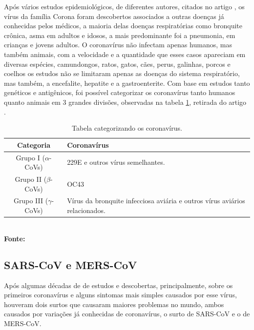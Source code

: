\documentclass[
  fleqn,ebook]{ic}
\begin{document}
Após vários estudos epidemiológicos, de diferentes autores, citados no artigo
\cite{jahangir2020coronavirus}, os vírus da família Corona foram descobertos
associados a outras doenças já conhecidas pelos médicos, a maioria delas doenças
respiratórias como bronquite crônica, asma em adultos e idosos, a mais
predominante foi a pneumonia, em crianças e jovens adultos. O coronavírus não
infectam apenas humanos, mas também animais, com a velocidade e a quantidade que
esses casos apareciam em diversas espécies, camundongos, ratos, gatos, cães,
perus, galinhas, porcos e coelhos os estudos não se limitaram apenas as doenças
do sistema respiratório, mas também, a encefalite, hepatite e a gastroenterite.
Com base em estudos tanto genéticos e antigênicos, foi possível categorizar os
coronavírus tanto humanos quanto animais em 3 grandes divisões, observadas na
tabela \ref{tab:corona3div}, retirada do artigo \cite{jahangir2020coronavirus}.

\begin{table}[H]
    \centering
    \caption{Tabela categorizando os coronavírus.}
    \begin{tabular}{|c|p{5cm}|}
        \hline
        \textbf{Categoria} & \textbf{Coronavírus}\\ \hline
        Grupo I ($\alpha$-CoVs) & 229E e outros vírus semelhantes. \\ \hline
        Grupo II ($\beta$-CoVs) & OC43 \\ \hline
        Grupo III ($\gamma$-CoVs) & Vírus da bronquite infecciosa aviária e 
        outros vírus aviários relacionados. \\
        \hline
    \end{tabular}\\ \vspace{0.3cm}
    {\footnotesize \textbf{Fonte: }\cite{jahangir2020coronavirus}}
    \label{tab:corona3div}
\end{table}

\hypertarget{sars-cov-e-mers-cov}{%
\subsection{SARS-CoV e MERS-CoV}\label{sars-cov-e-mers-cov}}

Após algumas décadas de de estudos e descobertas, principalmente, sobre os
primeiros coronavírus e alguns sintomas mais simples causados por esse vírus,
houveram dois surtos que causaram maiores problemas no mundo, ambos causados por
variações já conhecidas de coronavírus, o surto de SARS-CoV e o de MERS-CoV.
\end{document}
